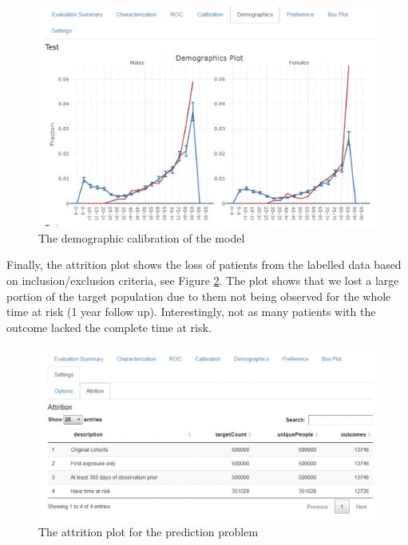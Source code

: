 \documentclass[11pt]{book}
\theoremstyle{definition}
\theoremstyle{definition}
\theoremstyle{definition}
\theoremstyle{remark}
\begin{document}
\begin{figure}

{\centering \includegraphics[width=1\linewidth]{images/PatientLevelPrediction/shiny/singleShiny/singleShinyDemo} 

}

\caption{The demographic calibration of the model}\label{fig:shinyDemo}
\end{figure}

Finally, the attrition plot shows the loss of patients from the labelled data based on inclusion/exclusion criteria, see Figure \ref{fig:shinyAtt}. The plot shows that we lost a large portion of the target population due to them not being observed for the whole time at risk (1 year follow up). Interestingly, not as many patients with the outcome lacked the complete time at risk.

\begin{figure}

{\centering \includegraphics[width=1\linewidth]{images/PatientLevelPrediction/shiny/singleShiny/singleShinyAtt} 

}

\caption{The attrition plot for the prediction problem}\label{fig:shinyAtt}
\end{figure}
\end{document}

